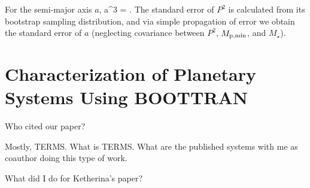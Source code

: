 For the semi-major axis $a$,
\beq
a^3 =  \approx {}.
\eeq
The standard error of $P^2$ is calculated from its bootstrap sampling
distribution, and via simple propagation of error we obtain the
standard error of $a$ (neglecting covariance between $P^2$, $M_{\rm
  p,min}$, and $M_\star$).


\section{Characterization of Planetary Systems Using BOOTTRAN}

Who cited our paper?

Mostly, TERMS. What is TERMS. What are the published systems with me
as coauthor doing this type of work.

What did I do for Ketherina's paper?
